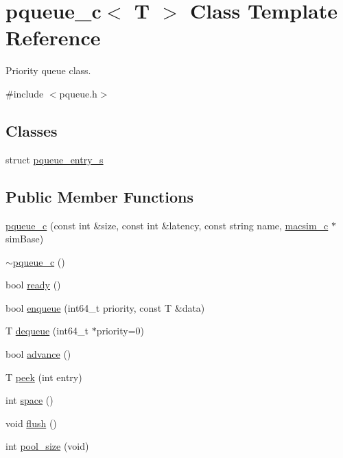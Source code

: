 \hypertarget{classpqueue__c}{
\section{pqueue\_\-c$<$ T $>$ Class Template Reference}
\label{classpqueue__c}
}


Priority queue class.  




{\ttfamily \#include $<$pqueue.h$>$}

\subsection*{Classes}
\begin{DoxyCompactItemize}
\item 
struct \hyperlink{structpqueue__c_1_1pqueue__entry__s}{pqueue\_\-entry\_\-s}
\end{DoxyCompactItemize}
\subsection*{Public Member Functions}
\begin{DoxyCompactItemize}
\item 
\hyperlink{classpqueue__c_aac893076784a5886e90f6b6693f977b9}{pqueue\_\-c} (const int \&size, const int \&latency, const string name, \hyperlink{classmacsim__c}{macsim\_\-c} $\ast$simBase)
\item 
\hyperlink{classpqueue__c_a131edc3557f5396fe862cb1b0bb4e1d0}{$\sim$pqueue\_\-c} ()
\item 
bool \hyperlink{classpqueue__c_a485b649c632873de95fc505f4b40158c}{ready} ()
\item 
bool \hyperlink{classpqueue__c_a49738ca2f17e817cd0bf3ef070a1bb2d}{enqueue} (int64\_\-t priority, const T \&data)
\item 
T \hyperlink{classpqueue__c_a5f0ad2c9f65821b8593c496fbd4a2e60}{dequeue} (int64\_\-t $\ast$priority=0)
\item 
bool \hyperlink{classpqueue__c_a9176ba07a11e5144f89cd6abe5f57d30}{advance} ()
\item 
T \hyperlink{classpqueue__c_a227233e46ec401c9e9f9e936caff4762}{peek} (int entry)
\item 
int \hyperlink{classpqueue__c_ac486e9e496a24d37bb01002c89069b63}{space} ()
\item 
void \hyperlink{classpqueue__c_adb6b0231c794f7aec762b07a1b21c9f7}{flush} ()
\item 
int \hyperlink{classpqueue__c_af05bf04f2e22a4ccfc67913bca5939a6}{pool\_\-size} (void)
\end{DoxyCompactItemize}
